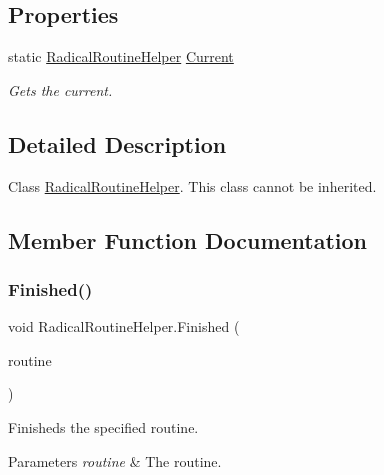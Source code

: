 \subsection*{Properties}
\begin{DoxyCompactItemize}
\item 
static \hyperlink{class_radical_routine_helper}{Radical\+Routine\+Helper} \hyperlink{class_radical_routine_helper_a7f25af81769f7c98c540ea3a46e7f555}{Current}
\begin{DoxyCompactList}\small\item\em Gets the current. \end{DoxyCompactList}\end{DoxyCompactItemize}


\subsection{Detailed Description}
Class \hyperlink{class_radical_routine_helper}{Radical\+Routine\+Helper}. This class cannot be inherited. 



\subsection{Member Function Documentation}
\mbox{\label{class_radical_routine_helper_aaacd9e96eac0a194c8e06981ad7fe535}} 
\subsubsection{\texorpdfstring{Finished()}{Finished()}}
{\footnotesize\ttfamily void Radical\+Routine\+Helper.\+Finished (\begin{DoxyParamCaption}\item[{\hyperlink{class_radical_routine}{Radical\+Routine}}]{routine }\end{DoxyParamCaption})\hspace{0.3cm}{\ttfamily [inline]}}



Finisheds the specified routine. 


\begin{DoxyParams}{Parameters}
{\em routine} & The routine.\\
\hline
\end{DoxyParams}
\mbox{\label{class_radical_routine_helper_ae6a4aec7bac59c73975ead99b89c64fe}} 
